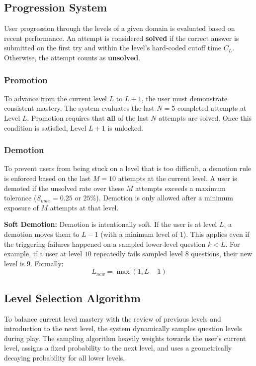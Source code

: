 \documentclass[11pt]{article}
\begin{document}
\subsection{Progression System}

User progression through the levels of a given domain is evaluated based on recent performance. An attempt is considered \textbf{solved} if the correct answer is submitted on the first try and within the level's hard-coded cutoff time $C_L$. Otherwise, the attempt counts as \textbf{unsolved}.

\subsubsection*{Promotion}
To advance from the current level $L$ to $L + 1$, the user must demonstrate consistent mastery. The system evaluates the last $N=5$ completed attempts at Level $L$. Promotion requires that \textbf{all} of the last $N$ attempts are solved. Once this condition is satisfied, Level $L + 1$ is unlocked.

\subsubsection*{Demotion}
To prevent users from being stuck on a level that is too difficult, a demotion rule is enforced based on the last $M=10$ attempts at the current level. A user is demoted if the unsolved rate over these $M$ attempts exceeds a maximum tolerance ($S_{max} = 0.25$ or $25\%$). Demotion is only allowed after a minimum exposure of $M$ attempts at that level.

\textbf{Soft Demotion:} Demotion is intentionally soft. If the user is at level $L$, a demotion moves them to $L-1$ (with a minimum level of $1$). This applies even if the triggering failures happened on a sampled lower-level question $k < L$. For example, if a user at level $10$ repeatedly fails sampled level $8$ questions, their new level is $9$. Formally:
\[
L_{new} = \max(1, L - 1)
\]

\subsection{Level Selection Algorithm}

To balance current level mastery with the review of previous levels and introduction to the next level, the system dynamically samples question levels during play. 
The sampling algorithm heavily weights towards the user's current level, assigns a fixed probability to the next level, and uses a geometrically decaying probability for all lower levels.
\end{document}
